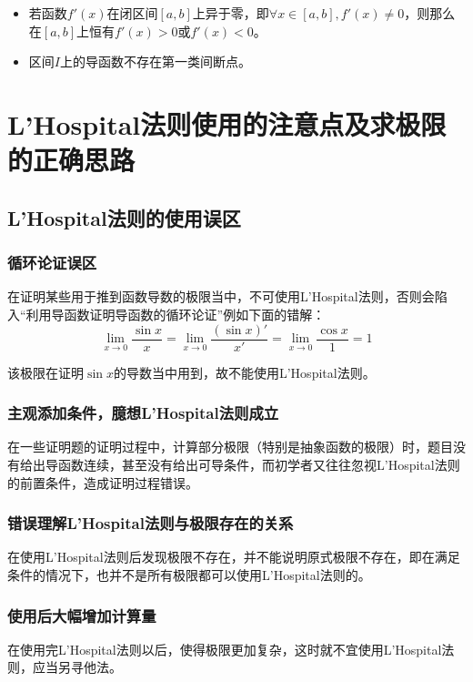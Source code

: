 \begin{itemize}
	\item 若函数$f'(x)$在闭区间$[a,b]$上异于零，即$\forall x\in [a,b],f'(x)\neq 0$，则那么在$[a,b]$上恒有$f'(x)>0$或$f'(x)<0$。
	\item 区间$I$上的导函数不存在第一类间断点。
\end{itemize}

\section{L'Hospital法则使用的注意点及求极限的正确思路}\label{sec:4.7}

\subsection{L'Hospital法则的使用误区}\label{sec:4.7.1}

\subsubsection{循环论证误区}
在证明某些用于推到函数导数的极限当中，不可使用L'Hospital法则，否则会陷入“利用导函数证明导函数的循环论证”例如下面的错解：
\[\lim_{x\to 0}\frac{\sin{x}}{x}=\lim_{x\to 0}\frac{(\sin{x})'}{x'}=\lim_{x\to 0}\frac{\cos{x}}{1}=1\]

该极限在证明$\sin{x}$的导数当中用到，故不能使用L'Hospital法则。
\subsubsection{主观添加条件，臆想L'Hospital法则成立}
在一些证明题的证明过程中，计算部分极限（特别是抽象函数的极限）时，题目没有给出导函数连续，甚至没有给出可导条件，而初学者又往往忽视L'Hospital法则的前置条件，造成证明过程错误。

\subsubsection{错误理解L'Hospital法则与极限存在的关系}
在使用L'Hospital法则后发现极限不存在，并不能说明原式极限不存在，即在满足条件的情况下，也并不是所有极限都可以使用L'Hospital法则的。

\subsubsection{使用后大幅增加计算量}
在使用完L'Hospital法则以后，使得极限更加复杂，这时就不宜使用L'Hospital法则，应当另寻他法。

